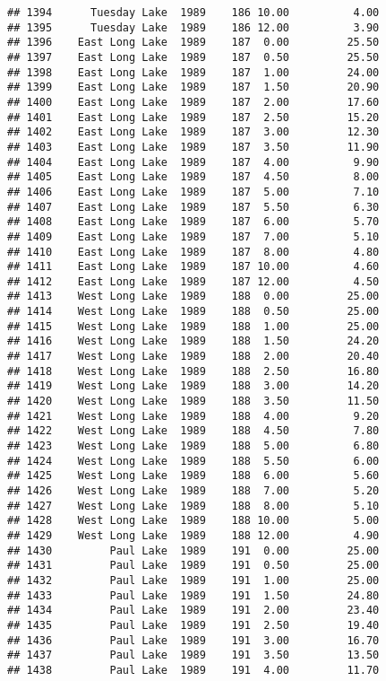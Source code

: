 \documentclass[
]{article}
\begin{document}
\begin{verbatim}
## 1394      Tuesday Lake  1989    186 10.00          4.00
## 1395      Tuesday Lake  1989    186 12.00          3.90
## 1396    East Long Lake  1989    187  0.00         25.50
## 1397    East Long Lake  1989    187  0.50         25.50
## 1398    East Long Lake  1989    187  1.00         24.00
## 1399    East Long Lake  1989    187  1.50         20.90
## 1400    East Long Lake  1989    187  2.00         17.60
## 1401    East Long Lake  1989    187  2.50         15.20
## 1402    East Long Lake  1989    187  3.00         12.30
## 1403    East Long Lake  1989    187  3.50         11.90
## 1404    East Long Lake  1989    187  4.00          9.90
## 1405    East Long Lake  1989    187  4.50          8.00
## 1406    East Long Lake  1989    187  5.00          7.10
## 1407    East Long Lake  1989    187  5.50          6.30
## 1408    East Long Lake  1989    187  6.00          5.70
## 1409    East Long Lake  1989    187  7.00          5.10
## 1410    East Long Lake  1989    187  8.00          4.80
## 1411    East Long Lake  1989    187 10.00          4.60
## 1412    East Long Lake  1989    187 12.00          4.50
## 1413    West Long Lake  1989    188  0.00         25.00
## 1414    West Long Lake  1989    188  0.50         25.00
## 1415    West Long Lake  1989    188  1.00         25.00
## 1416    West Long Lake  1989    188  1.50         24.20
## 1417    West Long Lake  1989    188  2.00         20.40
## 1418    West Long Lake  1989    188  2.50         16.80
## 1419    West Long Lake  1989    188  3.00         14.20
## 1420    West Long Lake  1989    188  3.50         11.50
## 1421    West Long Lake  1989    188  4.00          9.20
## 1422    West Long Lake  1989    188  4.50          7.80
## 1423    West Long Lake  1989    188  5.00          6.80
## 1424    West Long Lake  1989    188  5.50          6.00
## 1425    West Long Lake  1989    188  6.00          5.60
## 1426    West Long Lake  1989    188  7.00          5.20
## 1427    West Long Lake  1989    188  8.00          5.10
## 1428    West Long Lake  1989    188 10.00          5.00
## 1429    West Long Lake  1989    188 12.00          4.90
## 1430         Paul Lake  1989    191  0.00         25.00
## 1431         Paul Lake  1989    191  0.50         25.00
## 1432         Paul Lake  1989    191  1.00         25.00
## 1433         Paul Lake  1989    191  1.50         24.80
## 1434         Paul Lake  1989    191  2.00         23.40
## 1435         Paul Lake  1989    191  2.50         19.40
## 1436         Paul Lake  1989    191  3.00         16.70
## 1437         Paul Lake  1989    191  3.50         13.50
## 1438         Paul Lake  1989    191  4.00         11.70

\end{verbatim}
\end{document}
